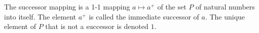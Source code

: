 The successor mapping is a 1-1 mapping $a \mapsto a^+$ of the set $P$ of natural numbers into itself. The element $a^+$ is called the immediate successor of $a$. The unique element of $P$ that is not a successor is denoted $1$.
